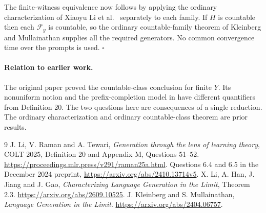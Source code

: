 \documentclass[11pt]{article}
\begin{document}
The finite-witness equivalence now follows by applying the ordinary characterization of Xiaoyu Li et al.\ \cite{witness} separately to each family. If $H$ is countable then each $\mathcal F_y$ is countable, so the ordinary countable-family theorem of Kleinberg and Mullainathan \cite{km} supplies all the required generators. No common convergence time over the prompts is used. \hfill$\square$

\paragraph{Relation to earlier work.} The original paper proved the countable-class conclusion for finite $Y$. Its nonuniform notion and the prefix-completion model in \cite{km} have different quantifiers from Definition 20. The two questions here are consequences of a single reduction. The ordinary characterization and ordinary countable-class theorem are prior results.
\begin{thebibliography}{9}
 J. Li, V. Raman and A. Tewari, \emph{Generation through the lens of learning theory}, COLT 2025, Definition 20 and Appendix M, Questions 51--52. \url{https://proceedings.mlr.press/v291/raman25a.html}. Questions 6.4 and 6.5 in the December 2024 preprint, \url{https://arxiv.org/abs/2410.13714v5}.
 X. Li, A. Han, J. Jiang and J. Gao, \emph{Characterizing Language Generation in the Limit}, Theorem 2.3. \url{https://arxiv.org/abs/2609.10525}.
 J. Kleinberg and S. Mullainathan, \emph{Language Generation in the Limit}. \url{https://arxiv.org/abs/2404.06757}.
\end{thebibliography}
\end{document}
